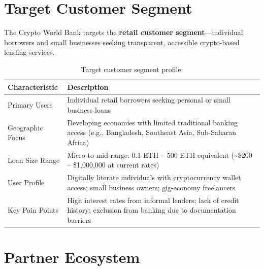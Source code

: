 \documentclass[12pt,a4paper]{report}
\newcommand{\tableheadfont}{\bfseries\small\color{PrimaryBlue}}
\newenvironment{moderntable}[1][H]{%
    \begin{table}[#1]\centering\small%
    \renewcommand{\arraystretch}{1.35}%
}{%
    \end{table}%
}
\begin{document}
\section{Target Customer Segment}

The Crypto World Bank targets the \textbf{retail customer segment}---individual borrowers and small businesses seeking transparent, accessible crypto-based lending services.

\begin{moderntable}
\caption{Target customer segment profile.}
\begin{tabular}{@{} >{\raggedright}p{3.8cm} >{\raggedright\arraybackslash}p{8.2cm} @{}}
\toprule
\tableheadfont Characteristic & \tableheadfont Description \\
\midrule
\rowcolor{RowShade}
Primary Users & Individual retail borrowers seeking personal or small business loans \\
Geographic Focus & Developing economies with limited traditional banking access (e.g., Bangladesh, Southeast Asia, Sub-Saharan Africa) \\
\rowcolor{RowShade}
Loan Size Range & Micro to mid-range: 0.1 ETH -- 500 ETH equivalent (\textasciitilde\$200 -- \$1,000,000 at current rates) \\
User Profile & Digitally literate individuals with cryptocurrency wallet access; small business owners; gig-economy freelancers \\
\rowcolor{RowShade}
Key Pain Points & High interest rates from informal lenders; lack of credit history; exclusion from banking due to documentation barriers \\
\bottomrule
\end{tabular}
\end{moderntable}

\section{Partner Ecosystem}
\end{document}
